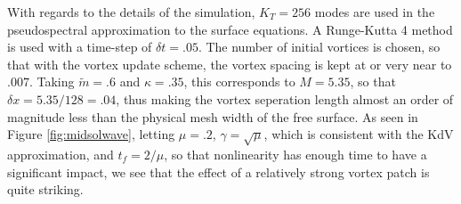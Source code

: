 \documentclass[a4paper,11pt]{article}
\begin{document}
With regards to the details of the simulation, $K_{T} = 256$ modes are used in the pseudospectral approximation to the surface equations.  A Runge-Kutta 4 method is used with a time-step of $\delta t = .05$.    The number of initial vortices is chosen, so that with the vortex update scheme, the vortex spacing is kept at or very near to $.007$.  Taking $\tilde{m}=.6$ and $\kappa = .35$, this corresponds to $M = 5.35$, so that $\delta x = 5.35/128 = .04$, thus making the vortex seperation length almost an order of magnitude less than the physical mesh width of the free surface.  As seen in Figure \ref{fig:midsolwave}, letting $\mu=.2$, $\gamma = \sqrt{\mu}$, which is consistent with the KdV approximation, and $t_{f}=2/\mu$, so that nonlinearity has enough time to have a significant impact, we see that the effect of a relatively strong vortex patch is quite striking.  
\end{document}
